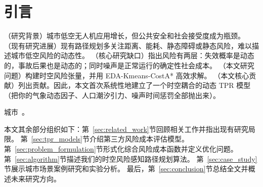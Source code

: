 
\section{引言}
\label{sec:introduction}
（研究背景）城市低空无人机应用增长，但公共安全和社会接受度成为瓶颈。
（现有研究进展）现有路径规划多关注距离、能耗、静态障碍或静态风险，难以描述城市低空风险的动态性。
（核心研究缺口）指出风险有两层：失效概率是动态的，事故后果也是动态的；同时噪声是正常运行的确定性社会成本。
（本文研究问题）构建时空风险张量，并用 EDA-Kmeans-CostA* 高效求解。
（本文核心贡献）列出贡献。因此，本文首次系统性地建立了一个时空耦合的动态 TPR 模型（把你的气象动态因子、人口潮汐引力、噪声时间惩罚全部抛出来）。

城市~\cite{ref1, ref2}。



本文其余部分组织如下：第~\ref{sec:related_work}节回顾相关工作并指出现有研究局限。
第~\ref{sec:tpr_models}节介绍第三方风险成本评估模型。第~\ref{sec:problem_formulation}节形式化综合风险成本函数并定义优化问题。
第~\ref{sec:algorithm}节描述我们的时空风险感知路径规划算法。
第~\ref{sec:case_study}节展示城市场景案例研究和实验分析。
最后，第~\ref{sec:conclusion}节总结全文并概述未来研究方向。